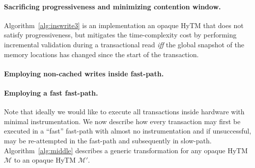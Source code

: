 \paragraph{Sacrificing progressiveness and minimizing contention window.}
%
Algorithm~\ref{alg:inswrite3} is an implementation an opaque HyTM that does not satisfy progressiveness, but mitigates
the time-complexity cost by performing incremental validation during a transactional read \emph{iff} the global snapshot of the memory locations
has changed since the start of the transaction.
%


\paragraph{Employing non-cached writes inside fast-path.}

\paragraph{Employing a fast fast-path.}
Note that ideally we would like to execute all transactions inside hardware with minimal instrumentation.
We now describe how every transaction may first be executed in a ``fast'' fast-path with almost no instrumentation
and if unsuccessful, may be re-attempted in the fast-path and subsequently in slow-path.
Algorithm~\ref{alg:middle} describes a generic transformation for any opaque HyTM $\mathcal{M}$ to an opaque
HyTM $\mathcal{M}'$.
%
